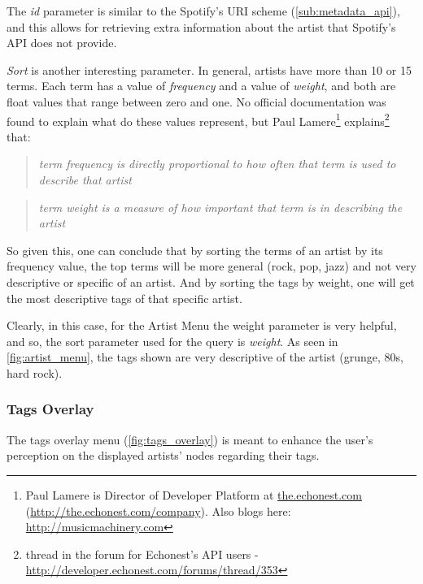       The \emph{id} parameter is similar to the Spotify's URI scheme (\ref{sub:metadata_api}), and this allows for retrieving extra information about the artist that Spotify's API does not provide.

      \emph{Sort} is another interesting parameter. 
      In general, artists have more than 10 or 15 terms.
      Each term has a value of \emph{frequency} and a value of \emph{weight}, and both are float values that range between zero and one.
      No official documentation was found to explain what do these values represent, but Paul Lamere\footnote{Paul Lamere is Director of Developer Platform at \url{the.echonest.com} (\url{http://the.echonest.com/company}). Also blogs here: \url{http://musicmachinery.com}} explains\footnote{thread in the forum for Echonest's API users - \url{http://developer.echonest.com/forums/thread/353}} that:

      \begin{quote}
      \emph{
        term frequency is directly proportional to how often that term is used to describe that artist
      }
      \end{quote}

      \begin{quote}
      \emph{
        term weight is a measure of how important that term is in describing the artist
      }
      \end{quote}

      So given this, one can conclude that by sorting the terms of an artist by its frequency value, the top terms will be more general (rock, pop, jazz) and not very descriptive or specific of an artist.
      And by sorting the tags by weight, one will get the most descriptive tags of that specific artist.

      Clearly, in this case, for the Artist Menu the weight parameter is very helpful, and so, the sort parameter used for the query is \emph{weight}.
      As seen in \ref{fig:artist_menu}, the tags shown are very descriptive of the artist (grunge, 80s, hard rock). \\


    \subsubsection{Tags Overlay} %
      \label{ssub:tags_overlay}

      The tags overlay menu (\ref{fig:tags_overlay}) is meant to enhance the user's perception on the displayed artists' nodes regarding their tags.

